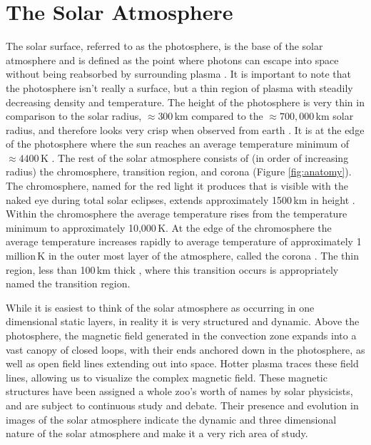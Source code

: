 \section{The Solar Atmosphere}
The solar surface, referred to as the photosphere, is the base of the solar atmosphere and is defined as the point where photons can escape into space without being reabsorbed by surrounding plasma  \citep{Priest2014}.
It is important to note that the photosphere isn't really a surface, but a thin region of plasma with steadily decreasing density and temperature.
The height of the photosphere is very thin in comparison to the solar radius, $\approx300$\,km compared to the $\approx700,000$\,km solar radius, and therefore looks very crisp when observed from earth \citep{JudgeBook}.
It is at the edge of the photosphere where the sun reaches an average temperature minimum of $\approx4400$\,K \citep{SolarPhysicsOverview}.
The rest of the solar atmosphere consists of (in order of increasing radius) the chromosphere, transition region, and corona (Figure \ref{fig:anatomy}).
The chromosphere, named for the red light it produces that is visible with the naked eye during total solar eclipses, extends approximately 1500\,km in height \citep{SolarPhysicsOverview}.
Within the chromosphere the average temperature rises from the temperature minimum to approximately 10,000\,K.
At the edge of the chromosphere the average temperature increases rapidly to average temperature of approximately 1 million\,K in the outer most layer of the atmosphere, called the corona \citep{SolarPhysicsOverview}.
The thin region, less than 100\,km thick \citep{Priest2014}, where this transition occurs is appropriately named the transition region.


While it is easiest to think of the solar atmosphere as occurring in one dimensional static layers, in reality it is very structured and dynamic.
Above the photosphere, the magnetic field generated in the convection zone expands into a vast canopy of closed loops, with their ends anchored down in the photosphere, as well as open field lines extending out into space.
Hotter plasma traces these field lines, allowing us to visualize the complex magnetic field.
These magnetic structures have been assigned a whole zoo's worth of names by solar physicists, and are subject to continuous study and debate.
Their presence and evolution in images of the solar atmosphere indicate the dynamic and three dimensional nature of the solar atmosphere and make it a very rich area of study.


